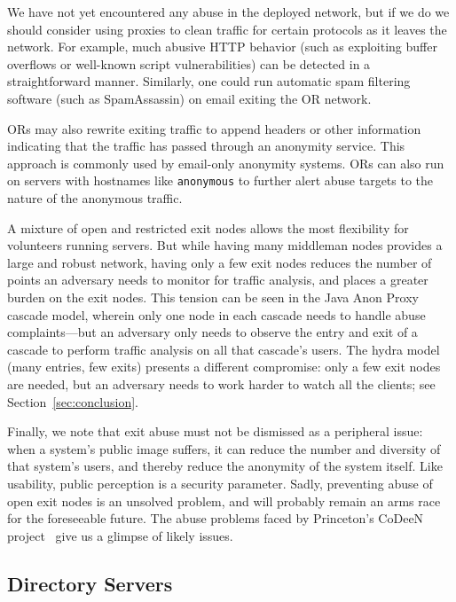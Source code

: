 \documentclass[twocolumn]{article}
\begin{document}
We have not yet encountered any abuse in the deployed network, but if
we do we should consider using proxies to clean traffic for certain
protocols as it leaves the network.  For example, much abusive HTTP
behavior (such as exploiting buffer overflows or well-known script
vulnerabilities) can be detected in a straightforward manner.
Similarly, one could run automatic spam filtering software (such as
SpamAssassin) on email exiting the OR network.

ORs may also rewrite exiting traffic to append
headers or other information indicating that the traffic has passed
through an anonymity service.  This approach is commonly used
by email-only anonymity systems.  ORs can also
run on servers with hostnames like {\tt anonymous} to further
alert abuse targets to the nature of the anonymous traffic.

A mixture of open and restricted exit nodes allows the most
flexibility for volunteers running servers. But while having many
middleman nodes provides a large and robust network,
having only a few exit nodes reduces the number of points
an adversary needs to monitor for traffic analysis, and places a
greater burden on the exit nodes.  This tension can be seen in the
Java Anon Proxy
cascade model, wherein only one node in each cascade needs to handle
abuse complaints---but an adversary only needs to observe the entry
and exit of a cascade to perform traffic analysis on all that
cascade's users. The hydra model (many entries, few exits) presents a
different compromise: only a few exit nodes are needed, but an
adversary needs to work harder to watch all the clients; see
Section~\ref{sec:conclusion}.

Finally, we note that exit abuse must not be dismissed as a peripheral
issue: when a system's public image suffers, it can reduce the number
and diversity of that system's users, and thereby reduce the anonymity
of the system itself.  Like usability, public perception is a
security parameter.  Sadly, preventing abuse of open exit nodes is an
unsolved problem, and will probably remain an arms race for the
foreseeable future.  The abuse problems faced by Princeton's CoDeeN
project~\cite{darkside} give us a glimpse of likely issues.

\subsection{Directory Servers}
\label{subsec:dirservers}
\end{document}
